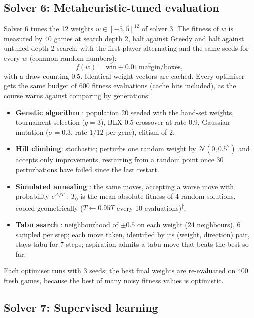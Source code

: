 \documentclass[11pt,a4paper]{article}
\newcommand{\outside}{\textsuperscript{$\dagger$}} %
\begin{document}
\subsection{Solver 6: Metaheuristic-tuned evaluation}

Solver 6 tunes the 12 weights $w\in[-5,5]^{12}$ of solver 3. The fitness of $w$ is
measured by 40 games at search depth 2, half against Greedy and half against untuned
depth-2 search, with the first player alternating and the same seeds for every $w$
(common random numbers):
\begin{equation}
  f(w) = \overline{\text{win}} + 0.01\,\overline{\text{margin}}/\text{boxes},
\end{equation}
with a draw counting $0.5$. Identical weight vectors are cached. Every optimiser gets the
same budget of 600 fitness evaluations (cache hits included), as the course warns against
comparing by generations:
\begin{itemize}
\item \textbf{Genetic algorithm} \cite{holland1975adaptation}: population 20 seeded with
  the hand-set weights, tournament selection ($q=3$), BLX-0.5 crossover
  \cite{eshelman1993blx} at rate 0.9, Gaussian mutation ($\sigma=0.3$, rate $1/12$ per
  gene), elitism of 2.
\item \textbf{Hill climbing}: stochastic; perturbs one random weight by
  $\mathcal{N}(0,0.5^2)$ and accepts only improvements, restarting from a random point
  once 30 perturbations have failed since the last restart.
\item \textbf{Simulated annealing} \cite{kirkpatrick1983annealing}: the same moves,
  accepting a worse move with probability $e^{\Delta/T}$ \cite{metropolis1953equation};
  $T_0$ is the mean absolute fitness of 4 random solutions, cooled geometrically
  ($T\leftarrow 0.95T$ every 10 evaluations)\outside.
\item \textbf{Tabu search} \cite{glover1989tabu}: neighbourhood of $\pm0.5$ on each weight
  (24 neighbours), 6 sampled per step; each move taken, identified by its (weight,
  direction) pair, stays tabu for 7 steps; aspiration admits a tabu move that beats the
  best so far.
\end{itemize}
Each optimiser runs with 3 seeds; the best final weights are re-evaluated on 400 fresh
games, because the best of many noisy fitness values is optimistic.

\subsection{Solver 7: Supervised learning}
\end{document}
